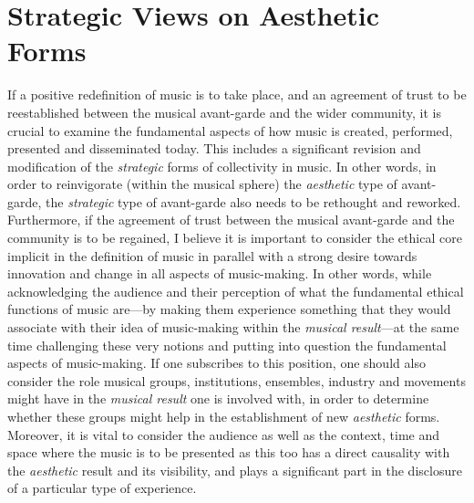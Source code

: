 \section{Strategic Views on Aesthetic Forms}

If a positive redefinition of music is to take place, and an agreement of trust to be reestablished between the musical avant-garde and the wider community, it is crucial to examine the fundamental aspects of how music is created, performed, presented and disseminated today. This includes a significant revision and modification of the \emph{strategic} forms of collectivity in music. In other words, in order to reinvigorate (within the musical sphere) the \emph{aesthetic} type of avant-garde, the \emph{strategic} type of avant-garde also needs to be rethought and reworked. Furthermore, if the agreement of trust between the musical avant-garde and the community is to be regained, I believe it is important to consider the ethical core implicit in the definition of music in parallel with a strong desire towards innovation and change in all aspects of music-making. In other words, while acknowledging the audience and their perception of what the fundamental ethical functions of music are---by making them experience something that they would associate with their idea of music-making within the \emph{musical result}---at the same time challenging these very notions and putting into question the fundamental aspects of music-making. If one subscribes to this position, one should also consider the role musical groups, institutions, ensembles, industry and movements might have in the \emph{musical result} one is involved with, in order to determine whether these groups might help in the establishment of new \emph{aesthetic} forms. Moreover, it is vital to consider the audience as well as the context, time and space where the music is to be presented as this too has a direct causality with the \emph{aesthetic} result and its visibility, and plays a significant part in the disclosure of a particular type of experience. 

